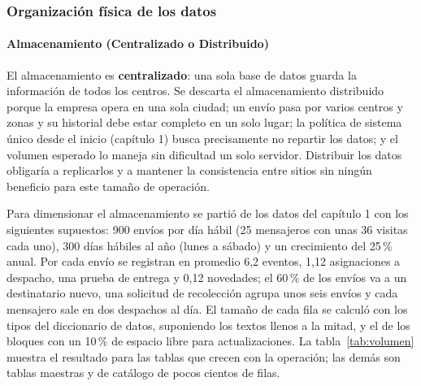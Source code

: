 \subsubsection{Organización física de los datos}

\paragraph{Almacenamiento (Centralizado o Distribuido)}
\label{sec:almacenamiento}

El almacenamiento es \textbf{centralizado}: una sola base de datos
guarda la información de todos los centros. Se descarta el
almacenamiento distribuido porque la empresa opera en una sola ciudad;
un envío pasa por varios centros y zonas y su historial debe estar
completo en un solo lugar; la política de sistema único desde el inicio
(capítulo 1) busca precisamente no repartir los datos; y el volumen
esperado lo maneja sin dificultad un solo servidor. Distribuir los datos
obligaría a replicarlos y a mantener la consistencia entre sitios sin
ningún beneficio para este tamaño de operación.

Para dimensionar el almacenamiento se partió de los datos del
capítulo 1 con los siguientes supuestos: 900 envíos por día hábil
(25 mensajeros con unas 36 visitas cada uno), 300 días hábiles al año
(lunes a sábado) y un crecimiento del 25\,\% anual. Por cada envío se
registran en promedio 6,2 eventos, 1,12 asignaciones a despacho, una
prueba de entrega y 0,12 novedades; el 60\,\% de los envíos va a un
destinatario nuevo, una solicitud de recolección agrupa unos seis envíos
y cada mensajero sale en dos despachos al día. El tamaño de cada fila se
calculó con los tipos del diccionario de datos, suponiendo los textos
llenos a la mitad, y el de los bloques con un 10\,\% de espacio libre
para actualizaciones. La tabla~\ref{tab:volumen} muestra el resultado
para las tablas que crecen con la operación; las demás son tablas
maestras y de catálogo de pocos cientos de filas.

